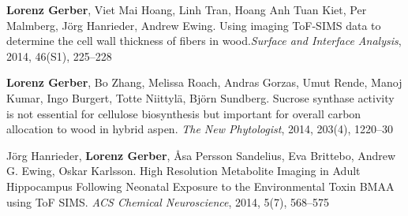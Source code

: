 \documentclass[10pt]{article}
\begin{document}
\begin{bibenum}
                                                                                           \item \textbf{Lorenz Gerber}, Viet Mai Hoang, Linh Tran,
                                                                                             Hoang Anh Tuan Kiet, Per Malmberg, J\"{o}rg Hanrieder, Andrew Ewing.
                                                                                             Using imaging ToF-SIMS data to determine the cell wall thickness of
                                                                                             fibers in wood.\textit{Surface and Interface Analysis}, 2014,
                                                                                             46(S1), 225--228\\


                                                                                           \item \textbf{Lorenz Gerber}, Bo Zhang, Melissa Roach,
                                                                                             Andras Gorzas, Umut Rende, Manoj Kumar, Ingo Burgert,
                                                                                             Totte Niittyl\"{a}, Bj\"{o}rn Sundberg. Sucrose synthase
                                                                                             activity is not essential for cellulose biosynthesis but important
                                                                                             for overall carbon allocation to wood in hybrid aspen.
                                                                                             \textit{The New Phytologist}, 2014, 203(4), 1220--30\\

                                                                                           \item J\"{o}rg Hanrieder, \textbf{Lorenz Gerber}, \AA sa Persson
                                                                                             Sandelius,  Eva Brittebo, Andrew G. Ewing, Oskar Karlsson.
                                                                                             High Resolution Metabolite Imaging in Adult Hippocampus
                                                                                             Following Neonatal Exposure to the Environmental Toxin BMAA
                                                                                             using ToF SIMS. \textit{ACS Chemical Neuroscience}, 2014,
                                                                                             5(7), 568--575\\


\end{bibenum}
\end{document}
